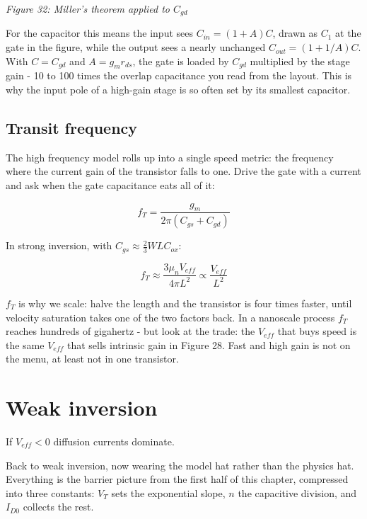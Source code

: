 {
\centering
{}
}

\emph{Figure 32: Miller's theorem applied to \(C_{gd}\)}

For the capacitor this means the input sees \(C_{in} = (1+A)C\), drawn
as \(C_1\) at the gate in the figure, while the output sees a nearly
unchanged \(C_{out} = (1+1/A)C\). With \(C = C_{gd}\) and
\(A = g_m r_{ds}\), the gate is loaded by \(C_{gd}\) multiplied by the
stage gain - 10 to 100 times the overlap capacitance you read from the
layout. This is why the input pole of a high-gain stage is so often set
by its smallest capacitor.

\subsection{Transit frequency}\label{transit-frequency}

The high frequency model rolls up into a single speed metric: the
frequency where the current gain of the transistor falls to one. Drive
the gate with a current and ask when the gate capacitance eats all of
it:

\[ f_T = \frac{g_m}{2 \pi (C_{gs} + C_{gd})} \]

In strong inversion, with \(C_{gs} \approx \frac{2}{3} W L C_{ox}\):

\[ f_T \approx \frac{3 \mu_n V_{eff}}{4 \pi L^2} \propto \frac{V_{eff}}{L^2} \]

\(f_T\) is why we scale: halve the length and the transistor is four
times faster, until velocity saturation takes one of the two factors
back. In a nanoscale process \(f_T\) reaches hundreds of gigahertz - but
look at the trade: the \(V_{eff}\) that buys speed is the same
\(V_{eff}\) that sells intrinsic gain in Figure 28. Fast and high gain
is not on the menu, at least not in one transistor.

\section{Weak inversion}\label{weak-inversion}

If \(V_{eff} < 0\) diffusion currents dominate.

Back to weak inversion, now wearing the model hat rather than the
physics hat. Everything is the barrier picture from the first half of
this chapter, compressed into three constants: \(V_T\) sets the
exponential slope, \(n\) the capacitive division, and \(I_{D0}\)
collects the rest.

